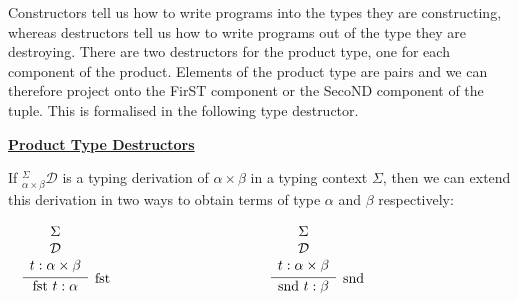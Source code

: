 \documentclass{book}
\begin{document}
        Constructors tell us how to write programs into the types they are constructing, whereas destructors tell us how to write programs out of the type they are destroying. There are two destructors for the product type, one for each component of the product. Elements of the product type are pairs and we can therefore project onto the FirST component or the SecoND component of the tuple. This is formalised in the following type destructor. 

        \begin{mdframed}

            \underline{{\bf Product Type Destructors}}
    
            If $^{\Sigma}_{\alpha \times \beta}\mathcal{D}$ is a typing derivation of $\alpha \times \beta$ in a typing context $\Sigma$, then we can extend this derivation in two ways to obtain terms of type $\alpha$ and $\beta$ respectively: 
    
            \begin{center}
                $\begin{array} { c c c }
                
                \begin{array}{ c  c  c }			
                     \infer[\fst]{\fst \ t : \alpha}
                        {\begin{array}{c}
                            \Sigma \\
                            \mathcal{D} \\
                            t : \alpha \times \beta
                        \end{array}}
                \end{array}
        
                & \hspace{3cm} &
        
                \begin{array}{ c  c  c }			
                    \infer[\snd]{\snd \ t : \beta}
                    {\begin{array}{c}
                        \Sigma \\
                        \mathcal{D} \\
                        t : \alpha \times \beta
                    \end{array}}	
                \end{array}\\		
        
                \end{array}$
            \end{center}	
        \end{mdframed}
\end{document}
